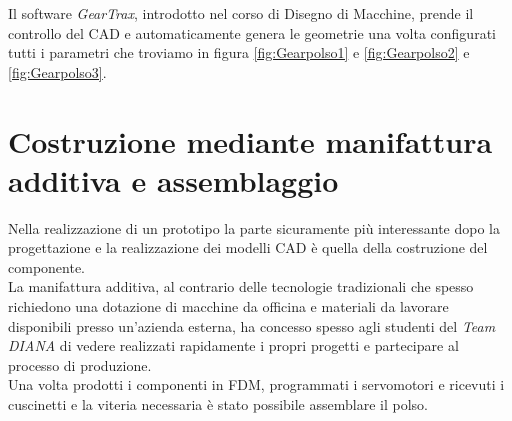\documentclass[%
corpo=11pt,
twoside,
 stile=classica,
oldstyle,
greek,%
]{toptesi}
\begin{document}
		Il software \textit{GearTrax}, introdotto nel corso di Disegno di Macchine, prende il controllo del CAD e automaticamente genera le geometrie una volta configurati tutti i parametri che troviamo in figura \ref{fig:Gearpolso1} e \ref{fig:Gearpolso2} e \ref{fig:Gearpolso3}.
			
		
	

	

\chapter{Costruzione mediante manifattura additiva e assemblaggio}
Nella realizzazione di un prototipo la parte sicuramente più interessante dopo la progettazione e la realizzazione dei modelli CAD è quella della costruzione del componente.\\
 La manifattura additiva, al contrario delle tecnologie tradizionali che spesso richiedono una dotazione di macchine da officina e materiali da lavorare disponibili presso un'azienda esterna, ha concesso spesso agli studenti del \textit{Team DIANA} di vedere realizzati rapidamente i propri progetti e partecipare al processo di produzione.\\
  Una volta prodotti i componenti in FDM, programmati i servomotori e ricevuti i cuscinetti e la viteria necessaria è stato possibile assemblare il polso. 
\end{document}
